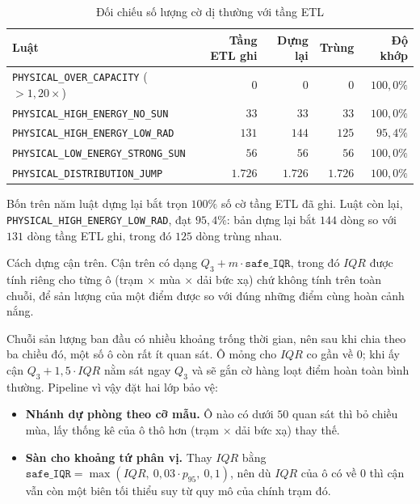 \documentclass[12pt, a4paper]{report}
\begin{document}
\begin{table}[htbp]
\centering
\caption{Đối chiếu số lượng cờ dị thường với tầng ETL}
\label{tab:tai_lap_luat}
\small
\begin{tabular}{l r r r r}
\toprule
\textbf{Luật} & \textbf{Tầng ETL ghi} & \textbf{Dựng lại} & \textbf{Trùng} & \textbf{Độ khớp} \\
\midrule
\texttt{PHYSICAL\_OVER\_CAPACITY} ($> 1{,}20\times$) & $0$      & $0$      & $0$      & $100{,}0\%$ \\
\texttt{PHYSICAL\_HIGH\_ENERGY\_NO\_SUN}   & $33$     & $33$     & $33$     & $100{,}0\%$ \\
\texttt{PHYSICAL\_HIGH\_ENERGY\_LOW\_RAD}  & $131$    & $144$    & $125$    & $95{,}4\%$ \\
\texttt{PHYSICAL\_LOW\_ENERGY\_STRONG\_SUN}& $56$     & $56$     & $56$     & $100{,}0\%$ \\
\texttt{PHYSICAL\_DISTRIBUTION\_JUMP}      & $1.726$  & $1.726$  & $1.726$  & $100{,}0\%$ \\
\bottomrule
\end{tabular}


\end{table}

Bốn trên năm luật dựng lại bắt trọn $100\%$ số cờ tầng ETL đã ghi. Luật còn lại,
\texttt{PHYSICAL\_HIGH\_ENERGY\_LOW\_RAD}, đạt $95{,}4\%$: bản dựng lại bắt $144$ dòng so với
$131$ dòng tầng ETL ghi, trong đó $125$ dòng trùng nhau.

Cách dựng cận trên. Cận trên có dạng $Q_3 + m \cdot \texttt{safe\_IQR}$, trong đó
$IQR$ được tính riêng cho từng ô (trạm $\times$ mùa $\times$ dải bức xạ) chứ không
tính trên toàn chuỗi, để sản lượng của một điểm được so với đúng những điểm cùng hoàn cảnh
nắng.

Chuỗi sản lượng ban đầu có nhiều khoảng trống thời gian, nên sau khi chia theo ba chiều đó,
một số ô còn rất ít quan sát. Ô mỏng cho $IQR$ co gần về $0$; khi ấy cận
$Q_3 + 1{,}5 \cdot IQR$ nằm sát ngay $Q_3$ và sẽ gắn cờ hàng loạt điểm hoàn toàn bình
thường. Pipeline vì vậy đặt hai lớp bảo vệ:

\begin{itemize}
    \item \textbf{Nhánh dự phòng theo cỡ mẫu.} Ô nào có dưới $50$ quan sát thì bỏ chiều mùa,
    lấy thống kê của ô thô hơn (trạm $\times$ dải bức xạ) thay thế.
    \item \textbf{Sàn cho khoảng tứ phân vị.} Thay $IQR$ bằng
    $\texttt{safe\_IQR} = \max(IQR,\ 0{,}03 \cdot p_{95},\ 0{,}1)$, nên dù $IQR$ của ô có về
    $0$ thì cận vẫn còn một biên tối thiểu suy từ quy mô của chính trạm đó.
\end{itemize}
\end{document}
